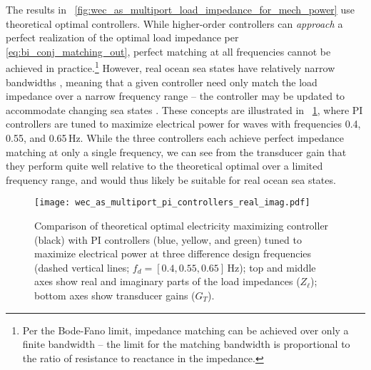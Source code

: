 \documentclass[5p,times]{elsarticle}
\begin{document}
The results in \figurename~\ref{fig:wec_as_multiport_load_impedance_for_mech_power} use theoretical optimal controllers.
While higher-order controllers can \emph{approach} a perfect realization of the optimal load impedance per \eqref{eq:bi_conj_matching_out}, perfect matching at all frequencies cannot be achieved in practice.\footnote{Per the Bode-Fano limit, impedance matching can be achieved over only a finite bandwidth -- the limit for the matching bandwidth is proportional to the ratio of resistance to reactance in the impedance.}
However, real ocean sea states have relatively narrow bandwidths \cite{Coe2020a}, meaning that a given controller need only match the load impedance over a narrow frequency range -- the controller may be updated to accommodate changing sea states \cite{Forbush:2022aa}.
These concepts are illustrated in \figurename~\ref{fig:gfx/wec_as_multiport_pi_controllers_real_imag}, where PI controllers are tuned to maximize electrical power for waves with frequencies 0.4, 0.55, and 0.65\,Hz.
While the three controllers each achieve perfect impedance matching at only a single frequency, we can see from the transducer gain that they perform quite well relative to the theoretical optimal over a limited frequency range, and would thus likely be suitable for real ocean sea states.

\begin{figure}[tb]
        \centering
        \texttt{[image: wec\_as\_multiport\_pi\_controllers\_real\_imag.pdf]}
        \caption{Comparison of theoretical optimal electricity maximizing controller (black) with PI controllers (blue, yellow, and green) tuned to maximize electrical power at three difference design frequencies (dashed vertical lines; $f_d = [0.4, 0.55, 0.65]$\,Hz); top and middle axes show real and imaginary parts of the load impedances ($Z_\ell$); bottom axes show transducer gains ($G_T$).}
        \label{fig:gfx/wec_as_multiport_pi_controllers_real_imag}
\end{figure}

\end{document}
